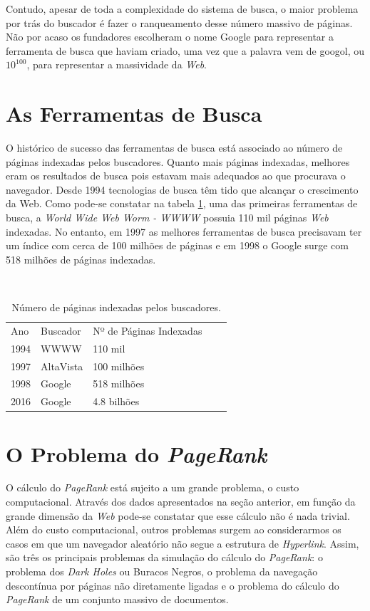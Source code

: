 Contudo, apesar de toda a complexidade do sistema de busca, o maior problema por trás do buscador é fazer o ranqueamento desse número massivo de páginas. Não por acaso os fundadores escolheram o nome Google para representar a ferramenta de busca que haviam criado, uma vez que a palavra vem de googol, ou $10^{100}$, para representar a massividade da \textit{Web}. 


\section{As Ferramentas de Busca}%

O histórico de sucesso das ferramentas de busca está associado ao número de páginas indexadas pelos buscadores. Quanto mais páginas indexadas, melhores eram os resultados de busca pois estavam mais adequados ao que procurava o navegador. Desde 1994 tecnologias de busca têm tido que alcançar o crescimento da Web. Como pode-se constatar na tabela \ref{websize}, uma das primeiras ferramentas de busca, a \textit{World Wide Web Worm - WWWW} \cite{mcbryan1994genvl} possuia 110 mil páginas \textit{Web} indexadas. No entanto, em 1997 as melhores ferramentas de busca precisavam ter um índice com cerca de 100 milhões de páginas e em 1998 o Google surge com 518 milhões de páginas indexadas.

\vspace{0.3cm}

\
\begin{table}[!htb]
\centering
\begin{tabular}{lllll}
Ano & Buscador & Nº de Páginas Indexadas\\
1994 & WWWW & 110 mil\\
1997 & AltaVista & 100 milhões\\
1998 & Google & 518 milhões\\
2016 & Google & 4.8 bilhões
\end{tabular}
\caption{Número de páginas indexadas pelos buscadores.}
\label{websize}
\end{table}


\section{O Problema do \textit{PageRank}}%

O cálculo do \textit{PageRank} está sujeito a um grande problema, o custo computacional. Através dos dados apresentados na seção anterior, em função da grande dimensão da \textit{Web} pode-se constatar que esse cálculo não é nada trivial. Além do custo computacional, outros problemas surgem ao considerarmos os casos em que um navegador aleatório \cite{avrachenkov2007monte} não segue a estrutura de \textit{Hyperlink}. Assim, são três os principais problemas da simulação do cálculo do \textit{PageRank}: o problema dos \textit{Dark Holes} ou Buracos Negros, o problema da navegação descontínua por páginas não diretamente ligadas e o problema do cálculo do \textit{PageRank} de um conjunto massivo de documentos.

